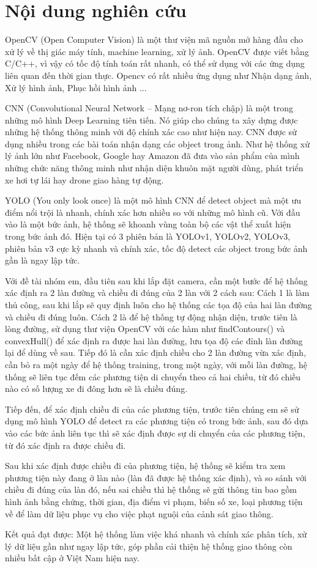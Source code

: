 \documentclass[12pt,twoside,a4paper]{article}
\begin{document}
\section{Nội dung nghiên cứu}
OpenCV (Open Computer Vision) là một thư viện mã nguồn mở hàng đầu cho xử lý về thị giác máy tính, machine learning, xử lý ảnh. OpenCV được viết bằng C/C++, vì vậy có tốc độ tính toán rất nhanh, có thể sử dụng với các ứng dụng liên quan đến thời gian thực. Opencv có rất nhiều ứng dụng như Nhận dạng ảnh, Xử lý hình ảnh, Phục hồi hình ảnh ...
\par
CNN (Convolutional Neural Network – Mạng nơ-ron tích chập) là một trong những mô hình Deep Learning tiên tiến. Nó giúp cho chúng ta xây dựng được những hệ thống thông minh với độ chính xác cao như hiện nay. CNN được sử dụng nhiều trong các bài toán nhận dạng các object trong ảnh. Như hệ thống xử lý ảnh lớn như Facebook, Google hay Amazon đã đưa vào sản phẩm của mình những chức năng thông minh như nhận diện khuôn mặt người dùng, phát triển xe hơi tự lái hay drone giao hàng tự động.
\par
YOLO (You only look once) là một mô hình CNN để detect object mà một ưu điểm nổi trội là nhanh, chính xác hơn nhiều so với những mô hình cũ. Với đầu vào là một bức ảnh, hệ thống sẽ khoanh vùng toàn bộ các vật thể xuất hiện trong bức ảnh đó. Hiện tại có 3 phiên bản là YOLOv1, YOLOv2, YOLOv3, phiên bản v3 cực kỳ nhanh và chính xác, tốc độ detect các object trong bức ảnh gần là ngay lập tức.
\par
Với đề tài nhóm em, đầu tiên sau khi lắp đặt camera, cần một bước để hệ thống xác định ra 2 làn đường và chiều đi đúng của 2 làn với 2 cách sau: Cách 1 là làm thủ công, sau khi lắp sẽ quy định luôn cho hệ thống các tọa độ của hai làn đường và chiều đi đúng luôn. Cách 2 là để hệ thống tự động nhận diện, trước tiên là lòng đường, sử dụng thư viện OpenCV với các hàm như findContours() và convexHull() để xác định ra được hai làn đường, lưu tọa độ các đỉnh làn đường lại để dùng về sau. Tiếp đó là cần xác định chiều cho 2 làn đường vừa xác định, cần bỏ ra một ngày để hệ thống training, trong một ngày, với mỗi làn đường, hệ thống sẽ liên tục đếm các phương tiện di chuyển theo cả hai chiều, từ đó chiều nào có số lượng xe đi đông hơn sẽ là chiều đúng.
\par
Tiếp đến, để xác định chiều đi của các phương tiện, trước tiên chúng em sẽ sử dụng mô hình YOLO để detect ra các phương tiện có trong bức ảnh, sau đó dựa vào các bức ảnh liên tục thì sẽ xác định được sự di chuyển của các phương tiện, từ đó xác định ra được chiều đi.
\par
Sau khi xác định được chiều đi của phương tiện, hệ thống sẽ kiểm tra xem phương tiện này đang ở làn nào (làn đã được hệ thống xác định), và so sánh với chiều đi đúng của làn đó, nếu sai chiều thì hệ thống sẽ gửi thông tin bao gồm hình ảnh bằng chứng, thời gian, địa điểm vi phạm, biến số xe, loại phương tiện về để làm dữ liệu phục vụ cho việc phạt nguội của cảnh sát giao thông.
\par
Kết quả đạt được: Một hệ thống làm việc khá nhanh và chính xác phân tích, xử lý dữ liệu gần như ngay lập tức, góp phần cải thiện hệ thống giao thông còn nhiều bất cập ở Việt Nam hiện nay.
\end{document}
